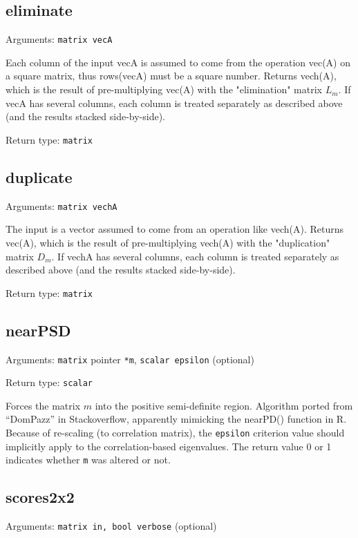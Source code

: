 \documentclass[11pt,english]{article}
\begin{document}
\subsection{eliminate}

Arguments: \texttt{matrix vecA}

Each column of the input vecA is assumed to come from the operation vec(A) 
on a square matrix, thus rows(vecA) must be a square number.
Returns vech(A), which is the result of pre-multiplying vec(A) with the 
"elimination" matrix $L_m$.
If vecA has several columns, each column is 
treated separately as described above (and the results stacked side-by-side).

\noindent Return type: \texttt{matrix}


\subsection{duplicate}

Arguments: \texttt{matrix vechA}

The input is a vector assumed to come from an operation like vech(A).
Returns vec(A), which is the result of pre-multiplying vech(A) with the 
"duplication" matrix $D_m$. If vechA has several columns, each column is 
treated separately as described above (and the results stacked side-by-side).

\noindent Return type: \texttt{matrix}

\subsection{nearPSD}

Arguments: \texttt{matrix} pointer \texttt{{*}m}, \texttt{scalar epsilon}
(optional) 

\noindent Return type: \texttt{scalar}

Forces the matrix $m$ into the positive semi-definite region. Algorithm
ported from ``DomPazz'' in Stackoverflow,
apparently mimicking the nearPD() function in R. Because of re-scaling
(to correlation matrix), the \texttt{epsilon} criterion value should
implicitly apply to the correlation-based eigenvalues. The return
value 0 or 1 indicates whether \texttt{m} was altered or not. 

\subsection{scores2x2}

Arguments: \texttt{matrix in, bool verbose} (optional)
\end{document}
